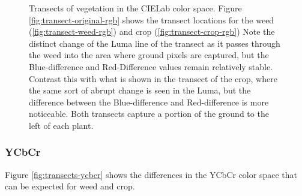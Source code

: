 \documentclass[letterpaper, notitlepage]{report}
\begin{document}
\begin{figure}[h]
	\centering
	\hfill
	\hfill
	\caption[CIELab Transects]{Transects of vegetation in the CIELab color space. Figure \ref{fig:transect-original-rgb} shows the transect locations for the weed (\ref{fig:transect-weed-rgb}) and crop (\ref{fig:transect-crop-rgb}) Note the distinct change of the Luma line of the transect as it passes through the weed into the area where ground pixels are captured, but the Blue-difference and Red-Difference values remain relatively stable. Contrast this with what is shown in the transect of the crop, where the same sort of abrupt change is seen in the Luma, but the difference between the Blue-difference and Red-difference is more noticeable. Both transects capture a portion of the ground to the left of each plant.}
	\label{fig:transects-cielab}
\end{figure}

\subsubsection{YCbCr}
Figure \ref{fig:transects-ycbcr} shows the differences in the YCbCr color space that can be expected for weed and crop.
\end{document}
